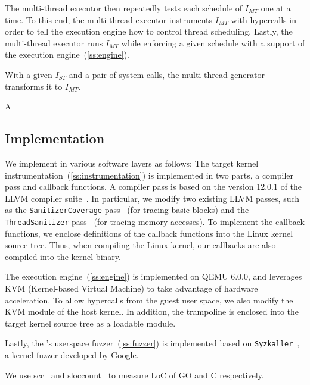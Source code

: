The multi-thread executor then repeatedly tests each schedule of
$I_{MT}$ one at a time.
%
To this end, the multi-thread executor instruments $I_{MT}$ with
hypercalls in order to tell the execution engine how to control thread
scheduling.
%
Lastly, the multi-thread executor runs $I_{MT}$ while enforcing a
given schedule with a support of the execution
engine~(\autoref{ss:engine}).




%





With a given $I_{ST}$ and a pair of system calls, the multi-thread
generator transforms it to $I_{MT}$.




%
A 





\subsection{Implementation}
\label{ss:impl}

We implement \sys in various software layers as follows:
%
The target kernel instrumentation~(\autoref{ss:instrumentation}) is
implemented in two parts, a compiler pass and callback functions. A
compiler pass is based on the version 12.0.1 of the LLVM compiler
suite~\cite{llvm}.
%
In particular, we modify two existing LLVM passes, such as the
\texttt{SanitizerCoverage} pass~\cite{kcovpass} (for tracing basic
blocks) and the \texttt{ThreadSanitizer} pass~\cite{tsanpass} (for
tracing memory accesses).
%
To implement the callback functions, we enclose definitions of the
callback functions into the Linux kernel source tree.
%
Thus, when compiling the Linux kernel, our callbacks are also compiled
into the kernel binary.


The execution engine~(\autoref{ss:engine}) is implemented on QEMU
6.0.0, and leverages KVM (Kernel-based Virtual Machine) to take
advantage of hardware acceleration.
%
To allow hypercalls from the guest user space, we also modify the KVM
module of the host kernel.
%
In addition, the trampoline is enclosed into the target kernel source
tree as a loadable module.


Lastly, the \sys's userspace fuzzer~(\autoref{ss:fuzzer}) is
implemented based on \texttt{Syzkaller}~\cite{syzkaller}, a kernel
fuzzer developed by Google.



We use scc~\cite{scc} and sloccount~\cite{sloccount} to measure LoC of
GO and C respectively.





